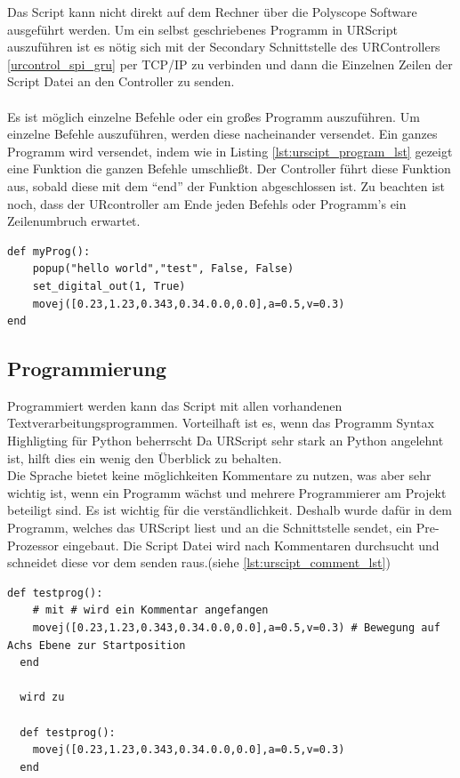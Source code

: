 Das Script kann nicht direkt auf dem Rechner über die Polyscope Software ausgeführt werden. Um ein selbst geschriebenes Programm in URScript auszuführen ist es nötig sich mit der Secondary Schnittstelle des URControllers \ref{urcontrol_spi_gru} per \ac{TCP/IP} zu verbinden und dann die Einzelnen Zeilen der Script Datei an den Controller zu senden.
\\\\
Es ist möglich einzelne Befehle oder ein großes Programm auszuführen. Um einzelne Befehle auszuführen, werden diese nacheinander versendet.
Ein ganzes Programm wird versendet, indem wie in Listing \ref{lst:urscipt_program_lst} gezeigt eine Funktion die ganzen Befehle umschließt. Der Controller führt diese Funktion aus, sobald diese mit dem ``end'' der Funktion abgeschlossen ist.
Zu beachten ist noch, dass der URcontroller am Ende jeden Befehls oder Programm's ein Zeilenumbruch erwartet.

\begin{lstlisting}[caption={Kleines Beispielprogram in URScript}, label=lst:urscipt_program_lst ,captionpos=b] 
def myProg():
	popup("hello world","test", False, False)
	set_digital_out(1, True)
	movej([0.23,1.23,0.343,0.34.0.0,0.0],a=0.5,v=0.3)
end
\end{lstlisting}

\subsection{Programmierung}
\label{programmierung_ur_script_rel}

Programmiert werden kann das Script mit allen vorhandenen Textverarbeitungsprogrammen. Vorteilhaft ist es, wenn das Programm \acs{Syntax Highligting} für Python beherrscht Da URScript sehr stark an Python angelehnt ist, hilft dies ein wenig den Überblick zu behalten.
\\Die Sprache bietet keine möglichkeiten Kommentare zu nutzen, was aber sehr wichtig ist, wenn ein Programm wächst und mehrere Programmierer am Projekt beteiligt sind. Es ist wichtig für die verständlichkeit. Deshalb wurde dafür in dem Programm, welches das URScript liest und an die Schnittstelle sendet, ein Pre-Prozessor eingebaut. Die Script Datei wird nach Kommentaren durchsucht und schneidet diese vor dem senden raus.(siehe \ref{lst:urscipt_comment_lst})

\begin{lstlisting}[caption={Beispiel kommentare vor und nach dem Pre-Prozessor}, label=lst:urscipt_comment_lst ,captionpos=b]
  def testprog():
    # mit # wird ein Kommentar angefangen
    movej([0.23,1.23,0.343,0.34.0.0,0.0],a=0.5,v=0.3) # Bewegung auf Achs Ebene zur Startposition
  end

  wird zu 

  def testprog():
    movej([0.23,1.23,0.343,0.34.0.0,0.0],a=0.5,v=0.3)
  end

\end{lstlisting}

